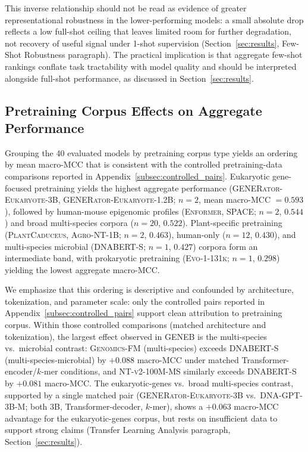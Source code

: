 \documentclass{article}
\theoremstyle{plain}
\theoremstyle{definition}
\theoremstyle{remark}
\begin{document}
This inverse relationship should not be read as evidence of greater
representational robustness in the lower-performing models: a small
absolute drop reflects a low full-shot ceiling that leaves limited
room for further degradation, not recovery of useful signal under
1-shot supervision (Section~\ref{sec:results}, Few-Shot Robustness
paragraph). The practical implication is that aggregate few-shot
rankings conflate task tractability with model quality and should be
interpreted alongside full-shot performance, as discussed in
Section~\ref{sec:results}.

\subsection{Pretraining Corpus Effects on Aggregate Performance}
\label{subsec:pretraining}

Grouping the 40 evaluated models by pretraining corpus type yields
an ordering by mean macro-MCC that is consistent with the controlled
pretraining-data comparisons reported in
Appendix~\ref{subsec:controlled_pairs}. Eukaryotic gene-focused
pretraining yields the highest aggregate performance
(\textsc{GENERator-Eukaryote-3B}, \textsc{GENERator-Eukaryote-1.2B};
$n=2$, mean macro-MCC $= 0.593$), followed by human-mouse epigenomic
profiles (\textsc{Enformer}, \textsc{SPACE}; $n=2$, $0.544$) and
broad multi-species corpora ($n=20$, $0.522$). Plant-specific
pretraining (\textsc{PlantCaduceus}, \textsc{Agro-NT-1B}; $n=2$,
$0.463$), human-only ($n=12$, $0.430$), and multi-species microbial
(\textsc{DNABERT-S}; $n=1$, $0.427$) corpora form an intermediate
band, with prokaryotic pretraining (\textsc{Evo-1-131k}; $n=1$,
$0.298$) yielding the lowest aggregate macro-MCC.

We emphasize that this ordering is descriptive and confounded by
architecture, tokenization, and parameter scale: only the controlled
pairs reported in Appendix~\ref{subsec:controlled_pairs} support
clean attribution to pretraining corpus. Within those controlled
comparisons (matched architecture and tokenization), the largest
effect observed in GENEB is the multi-species vs.\ microbial
contrast: \textsc{Genomics-FM} (multi-species) exceeds
\textsc{DNABERT-S} (multi-species-microbial) by $+0.088$ macro-MCC
under matched Transformer-encoder/$k$-mer conditions, and
\textsc{NT-v2-100M-MS} similarly exceeds \textsc{DNABERT-S} by
$+0.081$ macro-MCC. The eukaryotic-genes vs.\ broad multi-species
contrast, supported by a single matched pair
(\textsc{GENERator-Eukaryote-3B} vs.\ \textsc{DNA-GPT-3B-M}; both 3B,
Transformer-decoder, $k$-mer), shows a $+0.063$ macro-MCC advantage
for the eukaryotic-genes corpus, but rests on insufficient data to
support strong claims (Transfer Learning Analysis paragraph,
Section~\ref{sec:results}).
\end{document}
